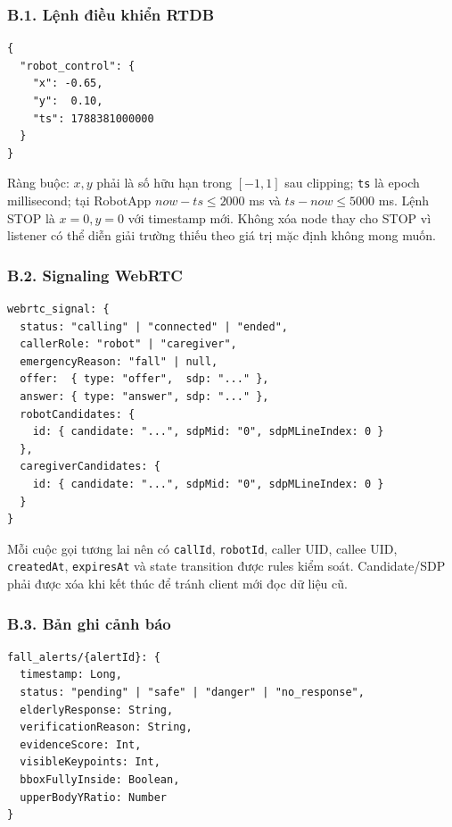 \subsubsection*{B.1. Lệnh điều khiển RTDB}

\begin{lstlisting}[caption={Ví dụ lệnh điều khiển hợp lệ}]
{
  "robot_control": {
    "x": -0.65,
    "y":  0.10,
    "ts": 1788381000000
  }
}
\end{lstlisting}

Ràng buộc: $x,y$ phải là số hữu hạn trong $[-1,1]$ sau clipping; \texttt{ts} là epoch millisecond; tại RobotApp $now-ts\leq2000$ ms và $ts-now\leq5000$ ms. Lệnh STOP là $x=0,y=0$ với timestamp mới. Không xóa node thay cho STOP vì listener có thể diễn giải trường thiếu theo giá trị mặc định không mong muốn.

\subsubsection*{B.2. Signaling WebRTC}

\begin{lstlisting}[caption={Cấu trúc signaling khái quát}]
webrtc_signal: {
  status: "calling" | "connected" | "ended",
  callerRole: "robot" | "caregiver",
  emergencyReason: "fall" | null,
  offer:  { type: "offer",  sdp: "..." },
  answer: { type: "answer", sdp: "..." },
  robotCandidates: {
    id: { candidate: "...", sdpMid: "0", sdpMLineIndex: 0 }
  },
  caregiverCandidates: {
    id: { candidate: "...", sdpMid: "0", sdpMLineIndex: 0 }
  }
}
\end{lstlisting}

Mỗi cuộc gọi tương lai nên có \texttt{callId}, \texttt{robotId}, caller UID, callee UID, \texttt{createdAt}, \texttt{expiresAt} và state transition được rules kiểm soát. Candidate/SDP phải được xóa khi kết thúc để tránh client mới đọc dữ liệu cũ.

\subsubsection*{B.3. Bản ghi cảnh báo}

\begin{lstlisting}[caption={Các trường cảnh báo té ngã}]
fall_alerts/{alertId}: {
  timestamp: Long,
  status: "pending" | "safe" | "danger" | "no_response",
  elderlyResponse: String,
  verificationReason: String,
  evidenceScore: Int,
  visibleKeypoints: Int,
  bboxFullyInside: Boolean,
  upperBodyYRatio: Number
}
\end{lstlisting}

